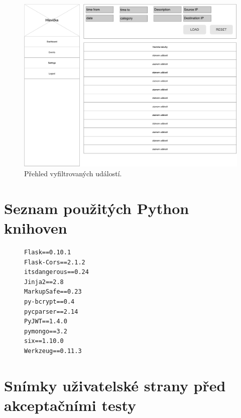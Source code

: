 \begin{figure}[ht]
    \centering
    \includegraphics[width=1\textwidth]{fig/wf_dashboard_events.pdf}
    \caption{Přehled vyfiltrovaných událostí.} \label{wf:dashboard_events}
\end{figure}

\chapter{Seznam použitých Python knihoven}

\begin{figure}[ht]
\lstset{basicstyle=\small,style=JSON}
\begin{lstlisting}
Flask==0.10.1
Flask-Cors==2.1.2
itsdangerous==0.24
Jinja2==2.8
MarkupSafe==0.23
py-bcrypt==0.4
pycparser==2.14
PyJWT==1.4.0
pymongo==3.2
six==1.10.0
Werkzeug==0.11.3
\end{lstlisting}
\label{code:requirements}
\end{figure}

\chapter{Snímky uživatelské strany před akceptačními testy}
\label{screens:before}

